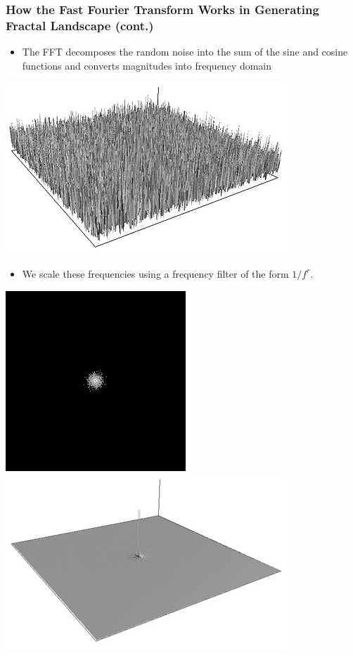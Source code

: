 \documentclass{beamer}
\begin{document}
\begin{frame}
\frametitle{How the Fast Fourier Transform Works in Generating Fractal Landscape (cont.)}
\begin{itemize}
\item The FFT decomposes the random noise into the sum of the sine and cosine functions and converts magnitudes into frequency domain
\end{itemize}
\begin{center}
\includegraphics[scale=0.17]{fft3d.jpg}
\end{center}
\begin{itemize}
\item We scale these frequencies using a frequency filter of the form $1/f^r$.
\end{itemize}
\begin{center}
\includegraphics[scale=0.2]{filter2d.jpg}
\includegraphics[scale=0.2]{filter3d.jpg}
\end{center}
\end{frame}
\end{document}
